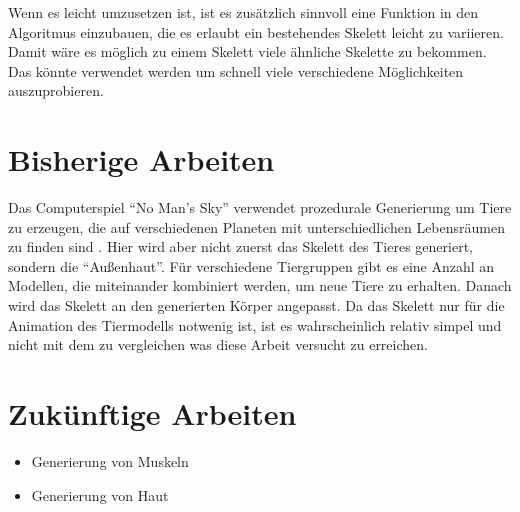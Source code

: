 Wenn es leicht umzusetzen ist, ist es zusätzlich sinnvoll eine Funktion in den Algoritmus einzubauen, die es erlaubt ein bestehendes Skelett leicht zu variieren. Damit wäre es möglich zu einem Skelett viele ähnliche Skelette zu bekommen. Das könnte verwendet werden um schnell viele verschiedene Möglichkeiten auszuprobieren.


\chapter{Bisherige Arbeiten}

Das Computerspiel "`No Man's Sky"' verwendet prozedurale Generierung um Tiere zu erzeugen, die auf verschiedenen Planeten mit unterschiedlichen Lebensräumen zu finden sind \cite{NoMansSky}. Hier wird aber nicht zuerst das Skelett des Tieres generiert, sondern die "`Außenhaut"'. Für verschiedene Tiergruppen gibt es eine Anzahl an Modellen, die miteinander kombiniert werden, um neue Tiere zu erhalten. Danach wird das Skelett an den generierten Körper angepasst. Da das Skelett nur für die Animation des Tiermodells notwenig ist, ist es wahrscheinlich relativ simpel und nicht mit dem zu vergleichen was diese Arbeit versucht zu erreichen.

\chapter{Zukünftige Arbeiten}

\begin{itemize}
 \item Generierung von Muskeln
 \item Generierung von Haut
\end{itemize}

